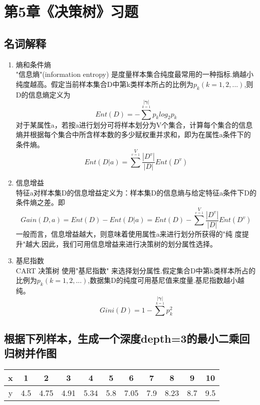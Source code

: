 \documentclass{ctexart}
\begin{document}
\section*{第5章《决策树》习题}
\subsection*{名词解释}
\begin{enumerate}[(1)]
\item 熵和条件熵\\
"信息熵"(information entropy) 是度量样本集合纯度最常用的一种指标.熵越小纯度越高。假定当前样本集合D中第k类样本所占的比例为$p_k(k=1,2,...)$,则D的信息熵定义为
\begin{equation*}
Ent(D)=-\sum\limits^{\bm{|\gamma}|}\limits_{k=1}p_klog_2p_k
\end{equation*}
对于某属性a，若按a进行划分可将样本划分为V个集合，计算每个集合的信息熵并根据每个集合中所含样本数的多少赋权重并求和，即为在属性a条件下的条件熵。
\begin{equation*}
Ent(D|a)=\sum\limits^V\limits_{v=1}\frac{|D^v|}{|D|}Ent(D^v)
\end{equation*}
\item 信息增益\\
特征a对样本集D的信息增益定义为：样本集D的信息熵与给定特征a条件下D的条件熵之差。即
\begin{equation*}
Gain(D,a)=Ent(D)-Ent(D|a)=Ent(D)-\sum\limits^V\limits_{v=1}\frac{|D^v|}{|D|}Ent(D^v)
\end{equation*}
一般而言，信息增益越大，则意味着使用属性a来进行划分所获得的"纯
度提升"越大.因此，我们可用信息增益来进行决策树的划分属性选择。
\item 基尼指数\\
CART 决策树  使用"基尼指数" 来选择划分属性.假定集合D中第k类样本所占的比例为$p_k(k=1,2,...)$,数据集D的纯度可用基尼值来度量.基尼指数越小越纯。
\begin{equation*}
Gini(D)=1-\sum\limits^{\bm{|\gamma}|}\limits_{k=1}p^2_k
\end{equation*}
\end{enumerate}

\subsection*{根据下列样本，生成一个深度depth=3的最小二乘回归树并作图}
\begin{table}[H]
	\centering
	\begin{tabular}{|c|c|c|c|c|c|c|c|c|c|c|}
	\hline
	x&1&2&3&4&5&6&7&8&9&10\\
	\hline
	y&4.5	&4.75	&4.91&5.34&5.8&7.05&7.9&8.23&8.7&9.5\\
	\hline
	\end{tabular}
\end{table}
\end{document}
